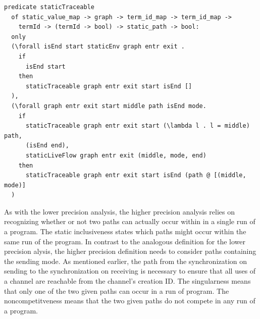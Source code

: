 \documentclass[10pt]{article}
\begin{document}
\begin{lstlisting}[language=logic, mathescape]
  predicate staticTraceable
  of static_value_map -> graph -> term_id_map -> term_id_map ->
    termId -> (termId -> bool) -> static_path -> bool:
  only
  (\forall isEnd start staticEnv graph entr exit .
    if
      isEnd start
    then
      staticTraceable graph entr exit start isEnd []
  ),
  (\forall graph entr exit start middle path isEnd mode. 
    if
      staticTraceable graph entr exit start (\lambda l . l = middle) path, 
      (isEnd end),
      staticLiveFlow graph entr exit (middle, mode, end) 
    then
      staticTraceable graph entr exit start isEnd (path @ [(middle, mode)]
  )
\end{lstlisting}

As with the lower precision analysis, the higher precision analysis relies on recognizing
whether or not two paths can actually occur within in a single run of a program. The static
inclusiveness states which paths might occur within the same run of the program.
In contrast to the analogous definition for the lower precision
alysis, the higher precision definition needs to consider paths containing the
sending mode.  As mentioned earlier, the path from the synchronization on sending to the
synchronization on receiving is necessary to ensure that all uses of a channel are reachable
from the channel's creation ID.  The singularness means that only one of the two
given paths can occur in a run of program.  The noncompetitveness means that the two
given paths do not compete in any run of a program. 
\end{document}
